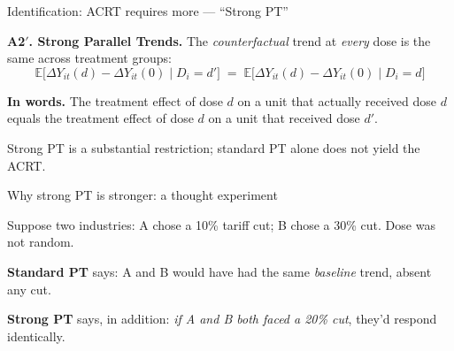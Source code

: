 \documentclass[aspectratio=169,12pt,t]{beamer}
\begin{document}
\begin{frame}{Identification: ACRT requires more --- ``Strong PT''}
\vspace{0.2cm}

\textbf{A2$'$. Strong Parallel Trends.} \;The \textit{counterfactual} trend at \textit{every} dose is the same across treatment groups:
\[
\mathbb{E}\big[\Delta Y_{it}(d) - \Delta Y_{it}(0) \mid D_i = d'\big] \;=\; \mathbb{E}\big[\Delta Y_{it}(d) - \Delta Y_{it}(0) \mid D_i = d\big]
\]

\vspace{0.4cm}

\textbf{In words.} \;The treatment effect of dose $d$ on a unit that actually received dose $d$ equals the treatment effect of dose $d$ on a unit that received dose $d'$.

\vspace{0.4cm}

 \;Strong PT is a substantial restriction; standard PT alone does not yield the ACRT.

\vspace{0.4em}
\end{frame}

\begin{frame}{Why strong PT is stronger: a thought experiment}
\vspace{0.2cm}

Suppose two industries: \;A chose a 10\% tariff cut; \;B chose a 30\% cut. \;Dose was not random.

\vspace{0.3cm}

\textbf{Standard PT} says: \;A and B would have had the same \textit{baseline} trend, absent any cut.

\vspace{0.3cm}

\textbf{Strong PT} says, in addition: \;\textit{if A and B both faced a 20\% cut}, they'd respond identically.

\vspace{0.3cm}

\end{frame}
\end{document}
